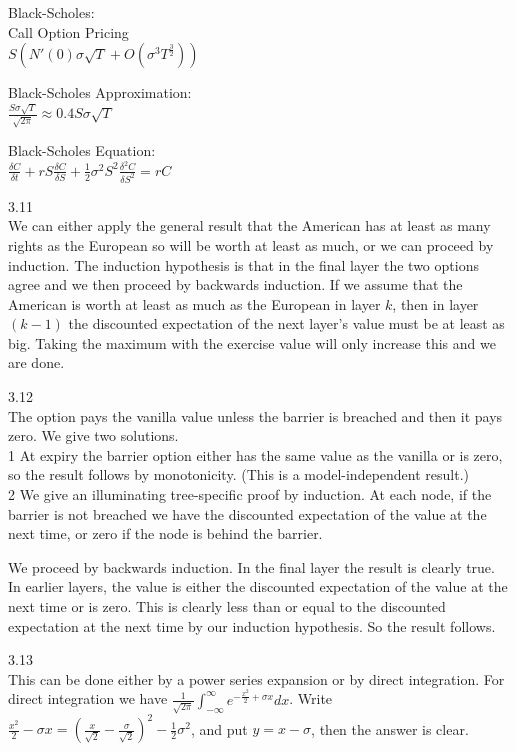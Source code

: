 Black-Scholes: \\
Call Option Pricing \\
$S \left( N'(0) \sigma \sqrt{T} + O\left( \sigma^3 T^{\frac{3}{2}} \right) \right)$

Black-Scholes Approximation: \\
$\frac{S \sigma \sqrt{T}}{\sqrt{2 \pi}} \approx 0.4 S \sigma \sqrt{T}$

Black-Scholes Equation: \\
$\frac{\delta C}{\delta t}+rS\frac{\delta C}{\delta S}+\frac{1}{2} \sigma^2 S^2 \frac{\delta^2 C}{\delta S^2} = rC$

3.11 \\
We can either apply the general result that the American has at least as many rights as the European so will be worth at least as much, or we can proceed by induction. The induction hypothesis is that in the final layer the two options agree and we then proceed by backwards induction. If we assume that the American is worth at least as much as the European in layer $k$, then in layer $(k-1)$ the discounted expectation of the next layer's value must be at least as big. Taking the maximum with the exercise value will only increase this and we are done.

3.12 \\
The option pays the vanilla value unless the barrier is breached and then it pays zero. We give two solutions. \\
1 At expiry the barrier option either has the same value as the vanilla or is zero, so the result follows by monotonicity. (This is a model-independent result.) \\
2 We give an illuminating tree-specific proof by induction. At each node, if the barrier is not breached we have the discounted expectation of the value at the next time, or zero if the node is behind the barrier.

We proceed by backwards induction. In the final layer the result is clearly true. In earlier layers, the value is either the discounted expectation of the value at the next time or is zero. This is clearly less than or equal to the discounted expectation at the next time by our induction hypothesis. So the result follows.

3.13 \\
This can be done either by a power series expansion or by direct integration. For direct integration we have $\frac{1}{\sqrt{2 \pi}}\int_{-\infty}^{\infty} e^{-\frac{x^2}{2}+\sigma x} dx$. Write $\frac{x^2}{2}-\sigma x=\left( \frac{x}{\sqrt{2}}-\frac{\sigma}{\sqrt{2}} \right)^2 - \frac{1}{2} \sigma^2$, and put $y=x-\sigma$, then the answer is clear.

